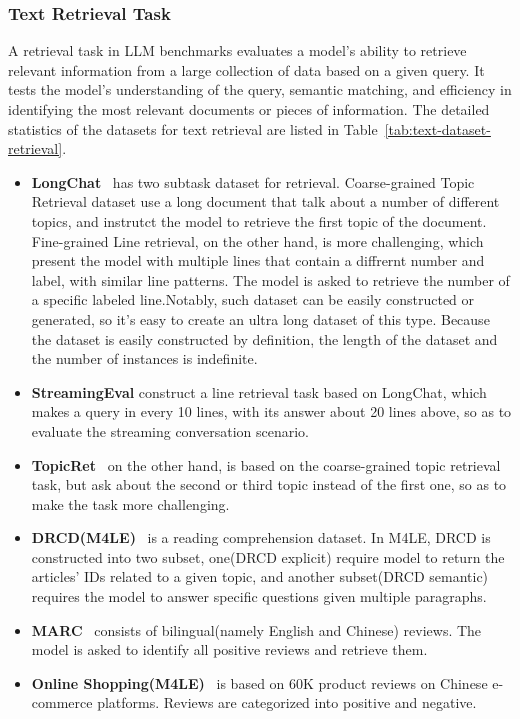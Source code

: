 


\subsubsection{Text Retrieval Task}
A retrieval task in LLM benchmarks evaluates a model's ability to retrieve relevant information from a large collection of data based on a given query. It tests the model's understanding of the query, semantic matching, and efficiency in identifying the most relevant documents or pieces of information. 
The detailed statistics of the datasets for text retrieval are listed in Table~\ref{tab:text-dataset-retrieval}.

\begin{itemize}[leftmargin=10pt]
    \item \textbf{LongChat}~\cite{longchat2023} has two subtask dataset for retrieval. Coarse-grained Topic Retrieval dataset use a long document that talk about a number of different topics, and instrutct the model to retrieve the first topic of the document. Fine-grained Line retrieval, on the other hand, is more challenging, which present the model with multiple lines that contain a diffrernt number and label, with similar line patterns. The model is asked to retrieve the number of a specific labeled line.Notably, such dataset can be easily constructed or generated, so it's easy to create an ultra long dataset of this type. Because the dataset is easily constructed by definition, the length of the dataset and the number of instances is indefinite. 
    \item \textbf{StreamingEval}\cite{DBLP:conf/iclr/XiaoTCHL24} construct a line retrieval task based on LongChat, which makes a query in every 10 lines, with its answer about 20 lines above, so as to evaluate the streaming conversation scenario.
    \item  \textbf{TopicRet}~\cite{an_l-eval:_2023} on the other hand, is based on the coarse-grained topic retrieval task, but ask about the second or third topic instead of the first one, so as to make the task more challenging.
    \item \textbf{DRCD(M4LE)}~\cite{kwan_m4le:_2023} is a reading comprehension dataset. In M4LE, DRCD is constructed into two subset, one(DRCD explicit) require model to return the articles' IDs related to a given topic, and another subset(DRCD semantic) requires the model to answer specific questions given multiple paragraphs. 
    \item \textbf{MARC}~\cite{kwan_m4le:_2023} consists of  bilingual(namely English and Chinese) 
reviews. The model is asked to identify all positive reviews and retrieve them. 
\item \textbf{Online Shopping(M4LE)}~\cite{kwan_m4le:_2023} is based on 60K product reviews on Chinese e-commerce platforms. Reviews are categorized into positive and negative. 
\end{itemize}

